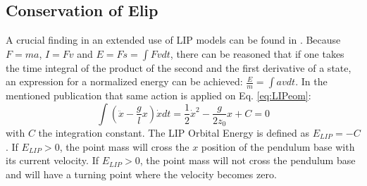 \subsection{Conservation of \ac{Elip}}
A crucial finding in an extended use of \ac{LIP} models can be found in \cite{kajita1992dynamic}. Because $F=ma$, $I=Fv$ and $E = Fs = \int Fv dt$, there can be reasoned that if one takes the time integral of the product of the second and the first derivative of a state, an expression for a normalized energy can be achieved: $\frac{E}{m}=\int av dt$. In the mentioned publication that same action is applied on Eq. \eqref{eq:LIPeom}:
\begin{equation}
\int (\ddot{x}-\frac{g}{l}x)\dot{x} dt = \frac{1}{2}\dot{x}^2-\frac{g}{2z_0}x +C=0
\label{eq:Elip}
\end{equation}
with $C$ the integration constant. The \ac{LIP} Orbital Energy is defined as $E_{LIP}=-C$. If $E_{LIP}>0$, the point mass will cross the $x$ position of the pendulum base with its current velocity. If $E_{LIP}>0$, the point mass will not cross the pendulum base and will have a turning point where the velocity becomes zero.

